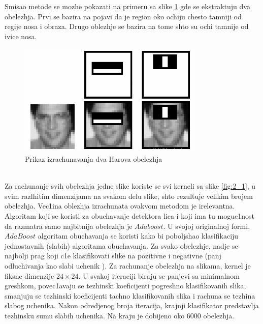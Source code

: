 \documentclass[a4paper, openany, oneside, 11pt]{book}
\begin{document}
Smisao metode se mozhe pokazati na primeru sa slike \ref{fig:2_2} gde se ekstraktuju dva obelezhja. Prvi se bazira na pojavi da je region oko ochiju chesto tamniji od regije nosa i obraza. Drugo oblezhje se bazira na tome shto su ochi tamnije od ivice nosa.
\begin{figure}[h!]
\centering
  \includegraphics[scale=0.6]{res/haar_features.png}
  \caption[Prikaz izrachunavanja dva Harova obelezhja]{Prikaz izrachunavanja dva Harova obelezhja \protect\footnotemark}
  \label{fig:2_2}
  \vspace{0pt}
\end{figure}\\
Za rachunanje svih obelezhja jedne slike koriste se svi kerneli sa slike \ref{fig:2_1}, u svim razlhitim dimenzijama na svakom delu slike, shto rezultuje velikim brojem obelezhja. Vec1ina oblezhja izrachunata ovakvom metodom je irelevantna. Algoritam koji se koristi za obuchavanje detektora lica i koji ima tu moguc1nost da razmatra samo najbitnija obelezhja je $Adaboost$. U svojoj originalnoj formi, $AdaBoost$ algoritam obuchavanja se koristi kako bi poboljshao klasifikaciju jednostavnih (slabih) algoritama obuchavanja. Za svako obelezhje, nadje se najbolji prag koji c1e klasifikovati slike na pozitivne i negativne  (panj odluchivanja kao slabi uchenik \cite{MUpredavanja}). Za rachunanje obelezhja na slikama, kernel je fiksne dimenzije $24\times24$. U svakoj iteraciji biraju se panjevi sa minimalnom greshkom, povec1avaju se tezhinski koeficijenti pogreshno klasifikovanih slika, smanjuju se tezhinski koeficijenti tachno klasifikovanih slika i rachuna se tezhina slabog uchenika. Nakon odredjenog broja iteracija, krajnji klasifikator predstavlja tezhinsku sumu slabih uchenika. Na kraju je dobijeno oko 6000 obelezhja.\\
\end{document}
